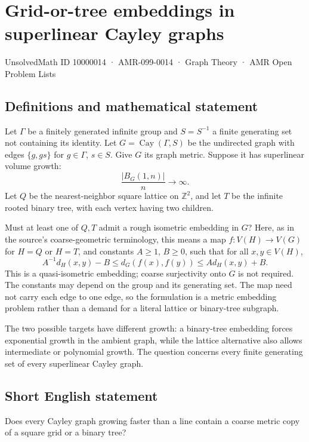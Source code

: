 \documentclass[11pt,a4paper]{article}
\begin{document}
\section*{Grid-or-tree embeddings in superlinear Cayley graphs}\label{10000014}
{\small UnsolvedMath ID 10000014 · AMR-099-0014 · Graph Theory · AMR Open Problem Lists}
\subsection{Definitions and mathematical statement}
Let $\Gamma$ be a finitely generated infinite group and $S=S^{-1}$ a finite generating set not containing its identity. Let $G=\operatorname{Cay}(\Gamma,S)$ be the undirected graph with edges $\{g,gs\}$ for $g\in\Gamma$, $s\in S$. Give $G$ its graph metric. Suppose it has superlinear volume growth:
\[
\frac{|B_G(1,n)|}{n}\longrightarrow\infty.
\]
Let $Q$ be the nearest-neighbor square lattice on $\mathbb Z^2$, and let $T$ be the infinite rooted binary tree, with each vertex having two children.

Must at least one of $Q,T$ admit a rough isometric embedding in $G$? Here, as in the source's coarse-geometric terminology, this means a map $f:V(H)\to V(G)$ for $H=Q$ or $H=T$, and constants $A\ge1$, $B\ge0$, such that for all $x,y\in V(H)$,
\[
A^{-1}d_H(x,y)-B\le d_G(f(x),f(y))\le A d_H(x,y)+B.
\]
This is a quasi-isometric embedding; coarse surjectivity onto $G$ is not required. The constants may depend on the group and its generating set. The map need not carry each edge to one edge, so the formulation is a metric embedding problem rather than a demand for a literal lattice or binary-tree subgraph.

The two possible targets have different growth: a binary-tree embedding forces exponential growth in the ambient graph, while the lattice alternative also allows intermediate or polynomial growth. The question concerns every finite generating set of every superlinear Cayley graph.
\subsection{Short English statement}
Does every Cayley graph growing faster than a line contain a coarse metric copy of a square grid or a binary tree?
\end{document}
